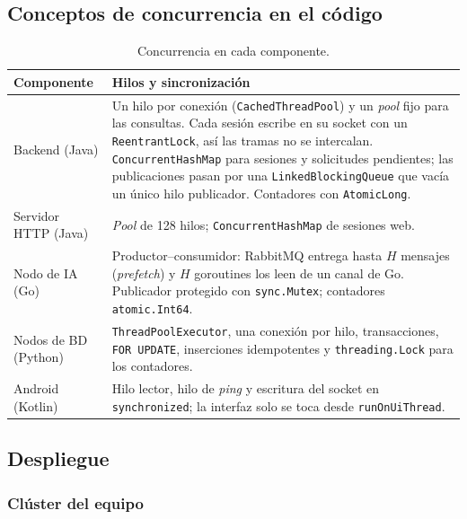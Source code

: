 \documentclass[10pt,a4paper]{article}
\begin{document}
\subsection{Conceptos de concurrencia en el código}

\begin{table}[H]
\centering
\small
\begin{tabularx}{\textwidth}{p{3.3cm}Y}
\toprule
\textbf{Componente} & \textbf{Hilos y sincronización} \\
\midrule
Backend (Java) & Un hilo por conexión (\texttt{CachedThreadPool}) y un \textit{pool} fijo para las consultas. Cada sesión escribe en su socket con un \texttt{ReentrantLock}, así las tramas no se intercalan. \texttt{ConcurrentHashMap} para sesiones y solicitudes pendientes; las publicaciones pasan por una \texttt{LinkedBlockingQueue} que vacía un único hilo publicador. Contadores con \texttt{AtomicLong}. \\
Servidor HTTP (Java) & \textit{Pool} de 128 hilos; \texttt{ConcurrentHashMap} de sesiones web. \\
Nodo de IA (Go) & Productor--consumidor: RabbitMQ entrega hasta $H$ mensajes (\textit{prefetch}) y $H$ goroutines los leen de un canal de Go. Publicador protegido con \texttt{sync.Mutex}; contadores \texttt{atomic.Int64}. \\
Nodos de BD (Python) & \texttt{ThreadPoolExecutor}, una conexión por hilo, transacciones, \texttt{FOR UPDATE}, inserciones idempotentes y \texttt{threading.Lock} para los contadores. \\
Android (Kotlin) & Hilo lector, hilo de \textit{ping} y escritura del socket en \texttt{synchronized}; la interfaz solo se toca desde \texttt{runOnUiThread}. \\
\bottomrule
\end{tabularx}
\caption{Concurrencia en cada componente.}
\label{tab:conceptos}
\end{table}

\subsection{Despliegue}

\subsubsection{Clúster del equipo}
\end{document}

